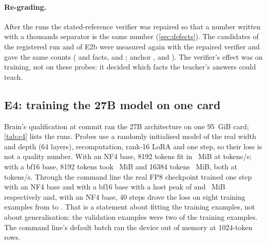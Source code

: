 \paragraph{Re-grading.} After the runs the stated-reference verifier was repaired so that a number
written with a thousands separator is the same number (\cref{sec:defects}). The candidates of the
registered run and of E2b were measured again with the repaired verifier and gave the same counts
(\mETworRegradeCandidateGZeroGZero{} and \mETworRegradeCandidateGOneGOne{} facts, and
\mETwobRegradeCandidateGZeroGZero{}; anchor \mETworRegradeCandidateGZeroAnchor, \mETworRegradeCandidateGOneAnchor{} and
\mETwobRegradeCandidateGZeroAnchor). The verifier's effect was on training, not on these probes:
it decided which facts the teacher's answers could teach.

\subsection{E4: training the 27B model on one card}\label{sec:e4}

Brain's qualification at commit \mEFourCommit{} ran the 27B architecture on one 95~GiB
card; \cref{tab:e4} lists the runs. Probes use a randomly initialised model of the real
width and depth (64 layers), recomputation, rank-16 LoRA and one step, so their loss is not
a quality number. With an NF4 base, 8192 tokens fit in
\mEFourProbeNfFourEightOneNineTwoPeakMib{}~MiB at
\mEFourProbeNfFourEightOneNineTwoTokensPerS{} tokens/s; with a bf16 base,
8192 tokens took \mEFourProbeBfOneSixEightOneNineTwoPeakMib{}~MiB and 16384 tokens
\mEFourProbeBfOneSixOneSixThreeEightFourPeakMib{}~MiB, both at
\mEFourProbeBfOneSixOneSixThreeEightFourTokensPerS{} tokens/s.
Through the command line the real FP8 checkpoint trained one step with an NF4 base and
with a bf16 base with a host peak of \mEFourCliNfFourOnestepHostRssMib{} and \mEFourCliBfOneSixOnestepHostRssMib{}~MiB respectively and, with an NF4 base,
40 steps drove the loss on eight training examples from
\mEFourCliNfFourFourZerostepLossFirst{} to \mEFourCliNfFourFourZerostepLossLast{}.
That is a statement about fitting the training examples, not about generalisation: the
validation examples were two of the training examples. The command line's default
batch ran the device out of memory at 1024-token rows.

\begin{table}[t]
\centering
\small

\caption{E4: qualification runs of the 27B architecture on one card (Brain's
qualification logs, copied unmodified apart from path names into ).}\label{tab:e4}
\end{table}

